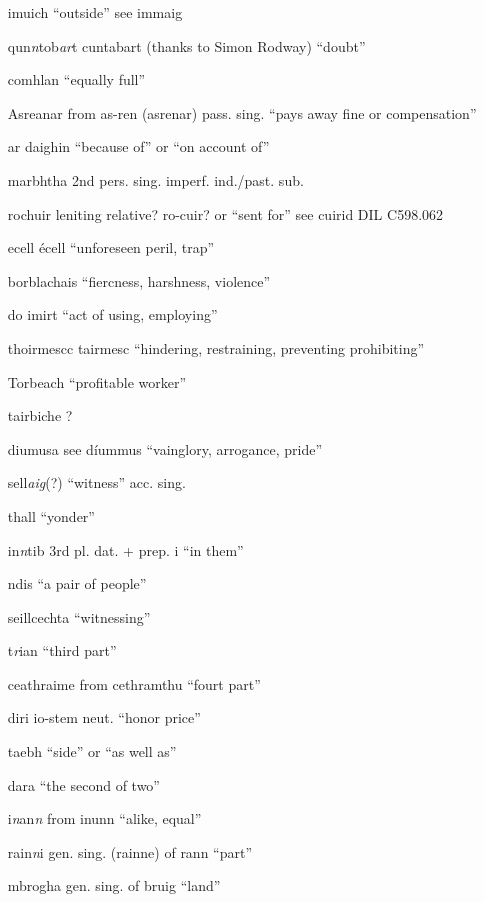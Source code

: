 \documentclass[11pt]{article}
\begin{document}
\begin{enumerate}
  \item[imuich] \enquote{outside} see immaig
  \item[qun\emph{n}tob\emph{ar}t] cuntabart (thanks to Simon Rodway) \enquote{doubt}
  \item[comhlan] \enquote{equally full}
  \item[Asreanar] from as-ren (asrenar) pass. sing. \enquote{pays away fine or compensation}
  \item[ar daighin] \enquote{because of} or \enquote{on account of}
  \item[marbhtha] 2nd pers. sing. imperf. ind./past. sub.
  \item[rochuir] leniting relative? ro-cuir? or \enquote{sent for} see cuirid DIL C598.062
  \item[ecell] \'{e}cell \enquote{unforeseen peril, trap}
  \item[borblachais] \enquote{fiercness, harshness, violence}
  \item[do imirt] \enquote{act of using, employing}
  \item[thoirmescc] tairmesc \enquote{hindering, restraining, preventing prohibiting}
  \item[Torbeach] \enquote{profitable worker}
  \item[tairbiche] ? 
  \item[diumusa] see d\'{i}ummus \enquote{vainglory, arrogance, pride}
  \item[sell\emph{aig}(?)] \enquote{witness} acc. sing.
  \item[thall] \enquote{yonder}
  \item[in\emph{n}tib] 3rd pl. dat. + prep. i \enquote{in them}
  \item[ndis] \enquote{a pair of people}
  \item[seillcechta] \enquote{witnessing}
  \item[t\emph{r}ian] \enquote{third part}
  \item[ceathraime] from cethramthu \enquote{fourt part}
  \item[diri] io-stem neut. \enquote{honor price}
  \item[taebh] \enquote{side} or \enquote{as well as}
  \item[dara] \enquote{the second of two}
  \item[i\emph{n}an\emph{n}] from inunn \enquote{alike, equal}
  \item[rain\emph{n}i] gen. sing. (rainne) of rann \enquote{part}
  \item[mbrogha] gen. sing. of bruig \enquote{land}

\end{enumerate}
\end{document}
